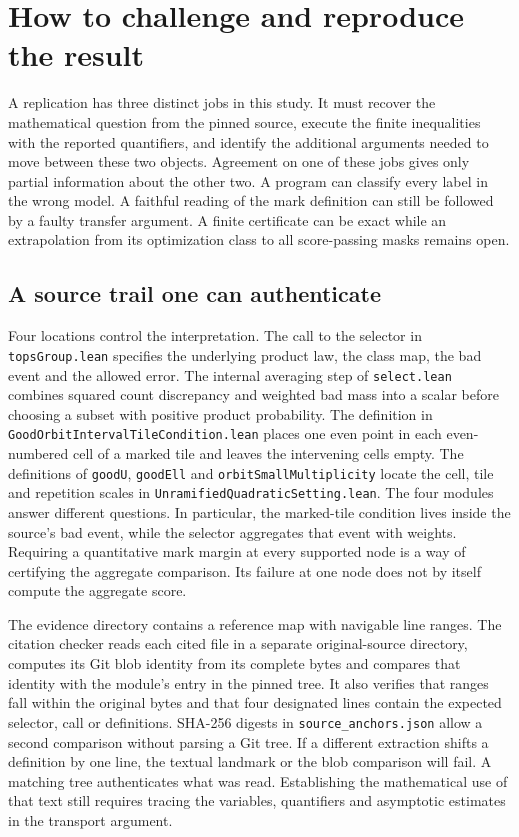 \section{How to challenge and reproduce the result}
\label{sec:experiment-audit}

A replication has three distinct jobs in this study. It must recover the mathematical question from the pinned source, execute the finite inequalities with the reported quantifiers, and identify the additional arguments needed to move between these two objects. Agreement on one of these jobs gives only partial information about the other two. A program can classify every label in the wrong model. A faithful reading of the mark definition can still be followed by a faulty transfer argument. A finite certificate can be exact while an extrapolation from its optimization class to all score-passing masks remains open.

\subsection{A source trail one can authenticate}

Four locations control the interpretation. The call to the selector in \texttt{topsGroup.lean} specifies the underlying product law, the class map, the bad event and the allowed error. The internal averaging step of \texttt{select.lean} combines squared count discrepancy and weighted bad mass into a scalar before choosing a subset with positive product probability. The definition in \texttt{GoodOrbitIntervalTileCondition.lean} places one even point in each even-numbered cell of a marked tile and leaves the intervening cells empty. The definitions of \texttt{goodU}, \texttt{goodEll} and \texttt{orbitSmallMultiplicity} locate the cell, tile and repetition scales in \texttt{UnramifiedQuadraticSetting.lean}. The four modules answer different questions. In particular, the marked-tile condition lives inside the source's bad event, while the selector aggregates that event with weights. Requiring a quantitative mark margin at every supported node is a way of certifying the aggregate comparison. Its failure at one node does not by itself compute the aggregate score.

The evidence directory contains a reference map with navigable line ranges. The citation checker reads each cited file in a separate original-source directory, computes its Git blob identity from its complete bytes and compares that identity with the module's entry in the pinned tree. It also verifies that ranges fall within the original bytes and that four designated lines contain the expected selector, call or definitions. SHA-256 digests in \texttt{source\_anchors.json} allow a second comparison without parsing a Git tree. If a different extraction shifts a definition by one line, the textual landmark or the blob comparison will fail. A matching tree authenticates what was read. Establishing the mathematical use of that text still requires tracing the variables, quantifiers and asymptotic estimates in the transport argument.

